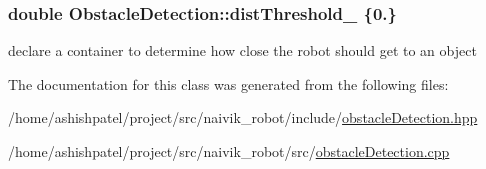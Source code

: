 \subsubsection[{\texorpdfstring{dist\+Threshold\+\_\+}{distThreshold_}}]{\setlength{\rightskip}{0pt plus 5cm}double Obstacle\+Detection\+::dist\+Threshold\+\_\+ \{0.\}\hspace{0.3cm}{\ttfamily [private]}}\hypertarget{classObstacleDetection_a594c4476745d0404a07135465f9e04e7}{}\label{classObstacleDetection_a594c4476745d0404a07135465f9e04e7}


declare a container to determine how close the robot should get to an object 



The documentation for this class was generated from the following files\+:\begin{DoxyCompactItemize}
\item 
/home/ashishpatel/project/src/naivik\+\_\+robot/include/\hyperlink{obstacleDetection_8hpp}{obstacle\+Detection.\+hpp}\item 
/home/ashishpatel/project/src/naivik\+\_\+robot/src/\hyperlink{obstacleDetection_8cpp}{obstacle\+Detection.\+cpp}\end{DoxyCompactItemize}
